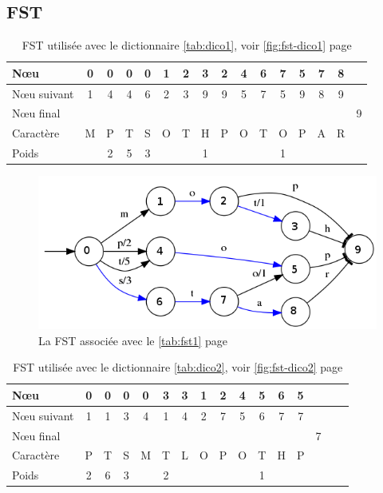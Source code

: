 \clearpage
\subsection{FST}

\begin{table}[ht]
    \centering
    \begin{tabular}{|l||c|c|c|c|c|c|c|c|c|c|c|c|c|c|c|}
        \hline
        N\oe u & 0 & 0 & 0 & 0 & 1 & 2 & 3 & 2 & 4 & 6 & 7 & 5 & 7 & 8 & \\ \hline
        N\oe u suivant & 1 & 4 & 4 & 6 & 2 & 3 & 9 & 9 & 5 & 7 & 5 & 9 & 8 & 9 & \\ \hline
        N\oe u final &&&&&&&&&&&&&&& 9 \\ \hline
        Caractère & M & P & T & S& O & T & H & P & O & T & O & P & A & R & \\ \hline
        Poids & & 2 & 5 & 3 &&& 1 &&&&1&&&& \\ \hline
    \end{tabular}
    \caption{FST utilisée avec le dictionnaire \autoref{tab:dico1}, voir \autoref{fig:fst-dico1} page \pageref{fig:fst-dico1}}
    \label{tab:fst1}
\end{table}

\begin{figure}[ht]
    \centering
    \includegraphics[scale=0.5]{../c_asm/1.png}
    \caption{La FST associée avec le \autoref{tab:fst1} page \pageref{tab:fst1}}
    \label{fig:fst-dico1}
\end{figure}

\begin{table}[ht]
    \centering
    \begin{tabular}{|l||c|c|c|c|c|c|c|c|c|c|c|c|c|c|c|}
        \hline
        N\oe u & 0 & 0 & 0 & 0 & 3 & 3 & 1 & 2 & 4 & 5 & 6 & 5 &\\ \hline
        N\oe u suivant & 1 & 1 & 3 & 4 & 1 & 4 & 2 & 7 & 5 & 6 & 7 & 7 &\\ \hline
        N\oe u final &&&&&&&&&&&&& 7 \\ \hline
        Caractère & P & T & S & M& T & L & O & P & O & T & H & P & \\ \hline
        Poids & 2 & 6 & 3 &  & 2 & & & & & 1 &&& \\ \hline
    \end{tabular}
    \caption{FST utilisée avec le dictionnaire \autoref{tab:dico2}, voir \autoref{fig:fst-dico2} page \pageref{fig:fst-dico2}}
    \label{tab:fst2}
\end{table}

